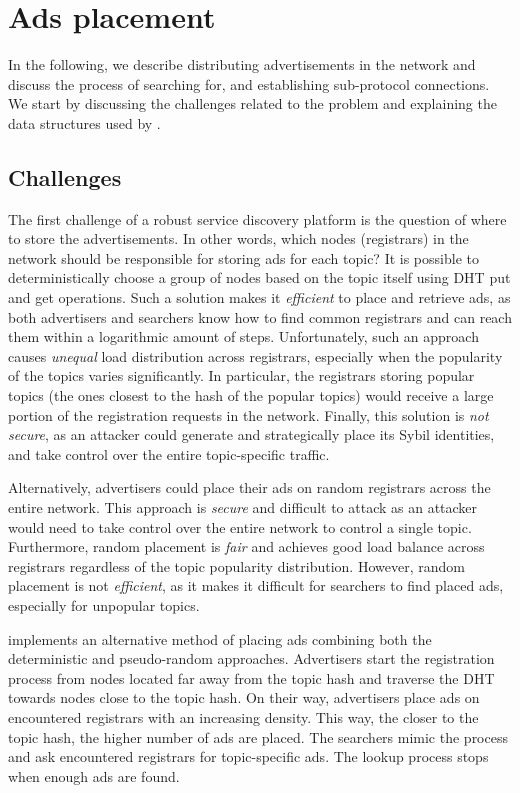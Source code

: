 
\section{Ads placement}
\label{sec:placement}
In the following, we describe distributing advertisements in the network and discuss the process of searching for, and establishing sub-protocol connections.  We start by discussing the challenges related to the problem and explaining the data structures used by \sysname. 

\subsection{Challenges}
The first challenge of a robust service discovery platform is the question of where to store the advertisements. In other words, which nodes (registrars) in the network should be responsible for storing ads for each topic? It is possible to deterministically choose a group of nodes based on the topic itself using DHT put and get operations. Such a solution makes it \emph{efficient} to place and retrieve ads, as both advertisers and searchers know how to find common registrars and can reach them within a logarithmic amount of steps. Unfortunately, such an approach causes \emph{unequal} load distribution across registrars, especially when the popularity of the topics varies significantly. In particular, the registrars storing popular topics (\ie the ones closest to the hash of the popular topics) would receive a large portion of the registration requests in the network. Finally, this solution is \emph{not secure}, as an attacker could generate and strategically place its Sybil identities, and take control over the entire topic-specific traffic. 

Alternatively, advertisers could place their ads on random registrars across the entire network. This approach is \emph{secure} and difficult to attack as an attacker would need to take control over the entire network to control a single topic. Furthermore, random placement is \emph{fair} and achieves good load balance across registrars regardless of the topic popularity distribution. However, random placement is not \emph{efficient}, as it makes it difficult for searchers to find placed ads, especially for unpopular topics. 

\sysname implements an alternative method of placing ads combining both the deterministic and pseudo-random approaches. Advertisers start the registration process from nodes located far away from the topic hash and traverse the DHT towards nodes close to the topic hash. On their way, advertisers place ads on encountered registrars with an increasing density. This way, the closer to the topic hash, the higher number of ads are placed. The searchers mimic the process and ask encountered registrars for topic-specific ads. The lookup process stops when enough ads are found.

